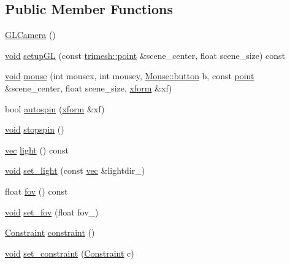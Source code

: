 \subsection*{Public Member Functions}
\begin{DoxyCompactItemize}
\item 
\hyperlink{classtrimesh_1_1GLCamera_a6c39c60c735a62c606550d8ca60616bd}{G\+L\+Camera} ()
\item 
\hyperlink{namespacetrimesh_a784ddfd979e1c579bda795a8edfc3f43}{void} \hyperlink{classtrimesh_1_1GLCamera_a060dc2d11b9c7e69e4a03421bf5a0670}{setup\+GL} (const \hyperlink{namespacetrimesh_a325b99fd6454b22fa4c4bc3223271b2c}{trimesh\+::point} \&scene\+\_\+center, float scene\+\_\+size) const
\item 
\hyperlink{namespacetrimesh_a784ddfd979e1c579bda795a8edfc3f43}{void} \hyperlink{classtrimesh_1_1GLCamera_ab300421205b8c4f699ed09ff4124e32f}{mouse} (int mousex, int mousey, \hyperlink{namespacetrimesh_1_1Mouse_a0b9f7f2e8a91299850fa63a8c995b02a}{Mouse\+::button} b, const \hyperlink{namespacetrimesh_a325b99fd6454b22fa4c4bc3223271b2c}{point} \&scene\+\_\+center, float scene\+\_\+size, \hyperlink{namespacetrimesh_ad504958f2f56e393991b848986a8459f}{xform} \&xf)
\item 
bool \hyperlink{classtrimesh_1_1GLCamera_aba8d85a19802c9c24fa478aa09738b2f}{autospin} (\hyperlink{namespacetrimesh_ad504958f2f56e393991b848986a8459f}{xform} \&xf)
\item 
\hyperlink{namespacetrimesh_a784ddfd979e1c579bda795a8edfc3f43}{void} \hyperlink{classtrimesh_1_1GLCamera_a588f762c28bffcf7d7c1e176f968ebff}{stopspin} ()
\item 
\hyperlink{namespacetrimesh_a4fc2b83feba99c931f837a0c7d4b4df1}{vec} \hyperlink{classtrimesh_1_1GLCamera_a454fa2c37f61c0b8e204e72d7615d1f1}{light} () const
\item 
\hyperlink{namespacetrimesh_a784ddfd979e1c579bda795a8edfc3f43}{void} \hyperlink{classtrimesh_1_1GLCamera_a1151d9c4aafcd873ba7df8e84669549a}{set\+\_\+light} (const \hyperlink{namespacetrimesh_a4fc2b83feba99c931f837a0c7d4b4df1}{vec} \&lightdir\+\_\+)
\item 
float \hyperlink{classtrimesh_1_1GLCamera_a66b0728bd1477ce920bf0e1ed8f15a65}{fov} () const
\item 
\hyperlink{namespacetrimesh_a784ddfd979e1c579bda795a8edfc3f43}{void} \hyperlink{classtrimesh_1_1GLCamera_a7020cc47b48ab434212155567c647faf}{set\+\_\+fov} (float fov\+\_\+)
\item 
\hyperlink{classtrimesh_1_1GLCamera_a4b7300c68956c148f6f8b014217faed9}{Constraint} \hyperlink{classtrimesh_1_1GLCamera_a726490d3604bcef7e54c7fbbde20379e}{constraint} ()
\item 
\hyperlink{namespacetrimesh_a784ddfd979e1c579bda795a8edfc3f43}{void} \hyperlink{classtrimesh_1_1GLCamera_a0f383a8117094b9013d3d945cc7dc979}{set\+\_\+constraint} (\hyperlink{classtrimesh_1_1GLCamera_a4b7300c68956c148f6f8b014217faed9}{Constraint} c)
\end{DoxyCompactItemize}


